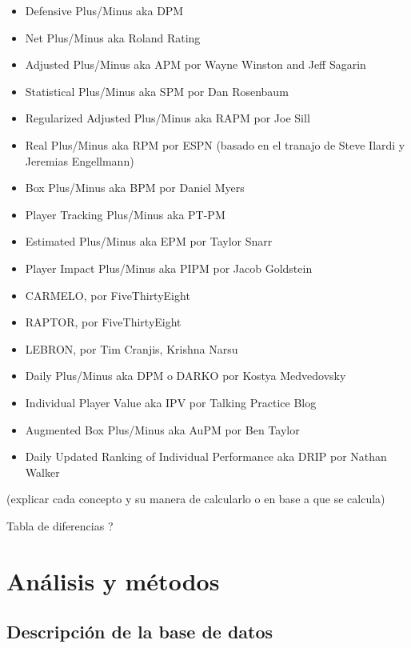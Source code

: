 \documentclass[paper=a4, fontsize=9pt]{article}
\begin{document}
\begin{itemize}
\item Defensive Plus/Minus aka DPM
\item Net Plus/Minus aka Roland Rating
\item Adjusted Plus/Minus aka APM por Wayne Winston and Jeff Sagarin
\item Statistical Plus/Minus aka SPM por Dan Rosenbaum
\item Regularized Adjusted Plus/Minus aka RAPM por Joe Sill
\item Real Plus/Minus aka RPM por ESPN (basado en el tranajo de Steve Ilardi y Jeremias Engellmann)
\item Box Plus/Minus aka BPM por Daniel Myers
\item Player Tracking Plus/Minus aka PT-PM
\item Estimated Plus/Minus aka EPM por Taylor Snarr
\item Player Impact Plus/Minus aka PIPM por Jacob Goldstein
\item CARMELO, por FiveThirtyEight
\item RAPTOR, por FiveThirtyEight
\item LEBRON, por Tim Cranjis, Krishna Narsu
\item Daily Plus/Minus aka DPM o DARKO por Kostya Medvedovsky
\item Individual Player Value aka IPV por Talking Practice Blog
\item Augmented Box Plus/Minus aka AuPM por Ben Taylor
\item Daily Updated Ranking of Individual Performance aka DRIP por Nathan Walker
\end{itemize}

(explicar cada concepto y su manera de calcularlo o en base a que se calcula)

Tabla de diferencias ?

\clearpage

\section{Análisis y métodos}

\subsection{Descripción de la base de datos}
\end{document}
